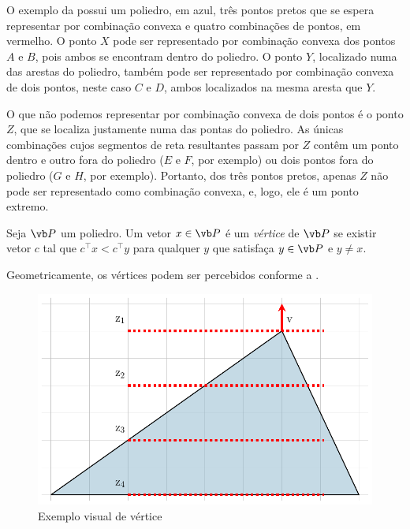 O exemplo da  possui um poliedro, em azul, três pontos pretos que se espera representar por combinação convexa e quatro combinações de pontos, em vermelho. O ponto $X$ pode ser representado por combinação convexa dos pontos $A$ e $B$, pois ambos se encontram dentro do poliedro. O ponto $Y$, localizado numa das arestas do poliedro, também pode ser representado por combinação convexa de dois pontos, neste caso $C$ e $D$, ambos localizados na mesma aresta que $Y$.

O que não podemos representar por combinação convexa de dois pontos é o ponto $Z$, que se localiza justamente numa das pontas do poliedro. As únicas combinações cujos segmentos de reta resultantes passam por $Z$ contêm um ponto dentro e outro fora do poliedro ($E$ e $F$, por exemplo) ou dois pontos fora do poliedro ($G$ e $H$, por exemplo). Portanto, dos três pontos pretos, apenas $Z$ não pode ser representado como combinação convexa, e, logo, ele é um ponto extremo.

\begin{mydef}[Vértice]\label{def:vértice}
 Seja $\vb P$ um poliedro. Um vetor $x\in \vb P$ é um \emph{vértice} de $\vb P$ se existir vetor $c$ tal que $c^\intercal x < c^\intercal y$ para qualquer $y$ que satisfaça $y\in \vb P$ e $y\neq x$.
\end{mydef}

Geometricamente, os vértices podem ser percebidos conforme a .

\begin{figure}[H]
\centering
\caption{Exemplo visual de vértice}\label{fig:vertices}
   \includegraphics[scale=1]{imagens/vertice.pdf}
\end{figure}

